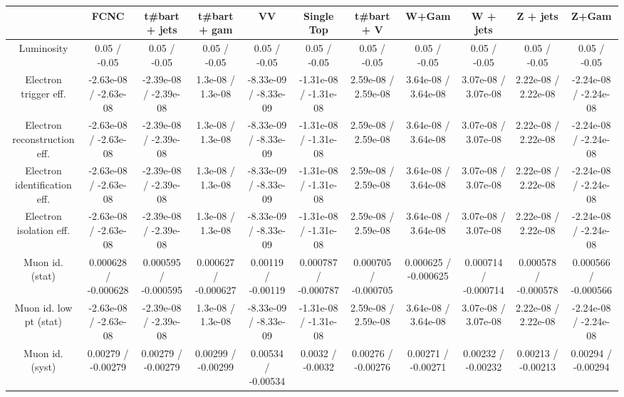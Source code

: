\begin{table}[htbp]
\begin{center}
\footnotesize
\begin{tabular}{|c|c|c|c|c|c|c|c|c|c|c|}
\hline 
      & FCNC      & t#bar{t} + jets      & t#bar{t} +  gam      & VV      & Single Top      & t#bar{t} + V      & W+Gam      & W + jets      & Z + jets      & Z+Gam \\ 
\hline 
  Luminosity & 0.05 / -0.05 & 0.05 / -0.05 & 0.05 / -0.05 & 0.05 / -0.05 & 0.05 / -0.05 & 0.05 / -0.05 & 0.05 / -0.05 & 0.05 / -0.05 & 0.05 / -0.05 & 0.05 / -0.05 \\ 
  Electron trigger eff. & -2.63e-08 / -2.63e-08 & -2.39e-08 / -2.39e-08 & 1.3e-08 / 1.3e-08 & -8.33e-09 / -8.33e-09 & -1.31e-08 / -1.31e-08 & 2.59e-08 / 2.59e-08 & 3.64e-08 / 3.64e-08 & 3.07e-08 / 3.07e-08 & 2.22e-08 / 2.22e-08 & -2.24e-08 / -2.24e-08 \\ 
  Electron reconstruction eff. & -2.63e-08 / -2.63e-08 & -2.39e-08 / -2.39e-08 & 1.3e-08 / 1.3e-08 & -8.33e-09 / -8.33e-09 & -1.31e-08 / -1.31e-08 & 2.59e-08 / 2.59e-08 & 3.64e-08 / 3.64e-08 & 3.07e-08 / 3.07e-08 & 2.22e-08 / 2.22e-08 & -2.24e-08 / -2.24e-08 \\ 
  Electron identification eff. & -2.63e-08 / -2.63e-08 & -2.39e-08 / -2.39e-08 & 1.3e-08 / 1.3e-08 & -8.33e-09 / -8.33e-09 & -1.31e-08 / -1.31e-08 & 2.59e-08 / 2.59e-08 & 3.64e-08 / 3.64e-08 & 3.07e-08 / 3.07e-08 & 2.22e-08 / 2.22e-08 & -2.24e-08 / -2.24e-08 \\ 
  Electron isolation eff. & -2.63e-08 / -2.63e-08 & -2.39e-08 / -2.39e-08 & 1.3e-08 / 1.3e-08 & -8.33e-09 / -8.33e-09 & -1.31e-08 / -1.31e-08 & 2.59e-08 / 2.59e-08 & 3.64e-08 / 3.64e-08 & 3.07e-08 / 3.07e-08 & 2.22e-08 / 2.22e-08 & -2.24e-08 / -2.24e-08 \\ 
  Muon id. (stat) & 0.000628 / -0.000628 & 0.000595 / -0.000595 & 0.000627 / -0.000627 & 0.00119 / -0.00119 & 0.000787 / -0.000787 & 0.000705 / -0.000705 & 0.000625 / -0.000625 & 0.000714 / -0.000714 & 0.000578 / -0.000578 & 0.000566 / -0.000566 \\ 
  Muon id. low pt (stat) & -2.63e-08 / -2.63e-08 & -2.39e-08 / -2.39e-08 & 1.3e-08 / 1.3e-08 & -8.33e-09 / -8.33e-09 & -1.31e-08 / -1.31e-08 & 2.59e-08 / 2.59e-08 & 3.64e-08 / 3.64e-08 & 3.07e-08 / 3.07e-08 & 2.22e-08 / 2.22e-08 & -2.24e-08 / -2.24e-08 \\ 
  Muon id. (syst) & 0.00279 / -0.00279 & 0.00279 / -0.00279 & 0.00299 / -0.00299 & 0.00534 / -0.00534 & 0.0032 / -0.0032 & 0.00276 / -0.00276 & 0.00271 / -0.00271 & 0.00232 / -0.00232 & 0.00213 / -0.00213 & 0.00294 / -0.00294 \\ 

\end{tabular}
\end{center}
\end{table}
